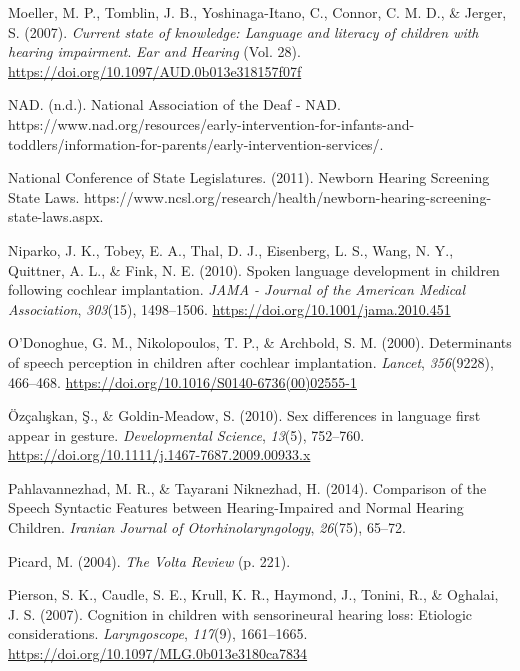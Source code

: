 \documentclass[english,man]{apa6}
\begin{document}
\leavevmode\hypertarget{ref-moeller2007}{}%
Moeller, M. P., Tomblin, J. B., Yoshinaga-Itano, C., Connor, C. M. D., \& Jerger, S. (2007). \emph{Current state of knowledge: Language and literacy of children with hearing impairment}. \emph{Ear and Hearing} (Vol. 28). \url{https://doi.org/10.1097/AUD.0b013e318157f07f}

\leavevmode\hypertarget{ref-nad}{}%
NAD. (n.d.). National Association of the Deaf - NAD. https://www.nad.org/resources/early-intervention-for-infants-and-toddlers/information-for-parents/early-intervention-services/.

\leavevmode\hypertarget{ref-nationalconferenceofstatelegislatures2011}{}%
National Conference of State Legislatures. (2011). Newborn Hearing Screening State Laws. https://www.ncsl.org/research/health/newborn-hearing-screening-state-laws.aspx.

\leavevmode\hypertarget{ref-niparko2010}{}%
Niparko, J. K., Tobey, E. A., Thal, D. J., Eisenberg, L. S., Wang, N. Y., Quittner, A. L., \& Fink, N. E. (2010). Spoken language development in children following cochlear implantation. \emph{JAMA - Journal of the American Medical Association}, \emph{303}(15), 1498--1506. \url{https://doi.org/10.1001/jama.2010.451}

\leavevmode\hypertarget{ref-odonoghue2000}{}%
O'Donoghue, G. M., Nikolopoulos, T. P., \& Archbold, S. M. (2000). Determinants of speech perception in children after cochlear implantation. \emph{Lancet}, \emph{356}(9228), 466--468. \url{https://doi.org/10.1016/S0140-6736(00)02555-1}

\leavevmode\hypertarget{ref-ozcaliskan2010}{}%
Özçalışkan, Ş., \& Goldin-Meadow, S. (2010). Sex differences in language first appear in gesture. \emph{Developmental Science}, \emph{13}(5), 752--760. \url{https://doi.org/10.1111/j.1467-7687.2009.00933.x}

\leavevmode\hypertarget{ref-pahlavannezhad2014}{}%
Pahlavannezhad, M. R., \& Tayarani Niknezhad, H. (2014). Comparison of the Speech Syntactic Features between Hearing-Impaired and Normal Hearing Children. \emph{Iranian Journal of Otorhinolaryngology}, \emph{26}(75), 65--72.

\leavevmode\hypertarget{ref-picard2004}{}%
Picard, M. (2004). \emph{The Volta Review} (p. 221).

\leavevmode\hypertarget{ref-pierson2007}{}%
Pierson, S. K., Caudle, S. E., Krull, K. R., Haymond, J., Tonini, R., \& Oghalai, J. S. (2007). Cognition in children with sensorineural hearing loss: Etiologic considerations. \emph{Laryngoscope}, \emph{117}(9), 1661--1665. \url{https://doi.org/10.1097/MLG.0b013e3180ca7834}
\end{document}
